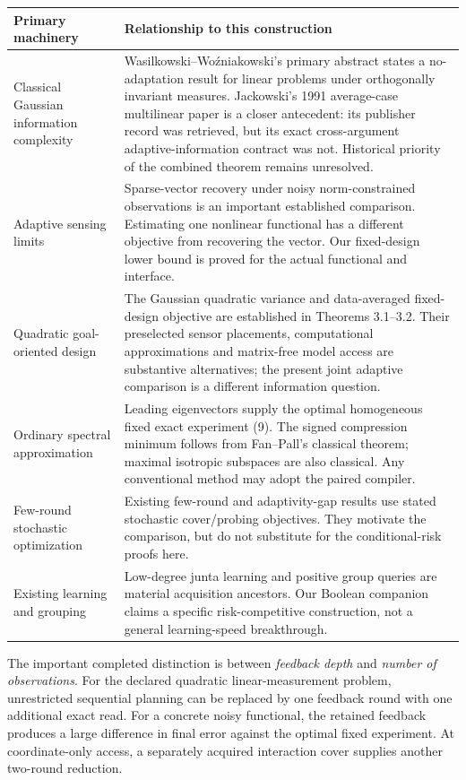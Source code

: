 \documentclass[11pt,a4paper]{article}
\begin{document}
\begin{longtable}{>{\raggedright\arraybackslash}p{}>{\raggedright\arraybackslash}p{}}
\toprule Primary machinery & Relationship to this construction\\\midrule\endhead
Classical Gaussian information complexity \cite{ww,ritter,jackowski} & Wasilkowski--Wo\'zniakowski's primary abstract states a no-adaptation result for linear problems under orthogonally invariant measures. Jackowski's 1991 average-case multilinear paper is a closer antecedent: its publisher record was retrieved, but its exact cross-argument adaptive-information contract was not. Historical priority of the combined theorem remains unresolved.\\[4pt]
Adaptive sensing limits \cite{acd} & Sparse-vector recovery under noisy norm-constrained observations is an important established comparison. Estimating one nonlinear functional has a different objective from recovering the vector. Our fixed-design lower bound is proved for the actual functional and interface.\\[4pt]
Quadratic goal-oriented design \cite{goal} & The Gaussian quadratic variance and data-averaged fixed-design objective are established in Theorems 3.1--3.2. Their preselected sensor placements, computational approximations and matrix-free model access are substantive alternatives; the present joint adaptive comparison is a different information question.\\[4pt]
Ordinary spectral approximation \cite{fanpall} & Leading eigenvectors supply the optimal homogeneous fixed exact experiment (9). The signed compression minimum follows from Fan--Pall's classical theorem; maximal isotropic subspaces are also classical. Any conventional method may adopt the paired compiler.\\[4pt]
Few-round stochastic optimization \cite{ghuge,gns} & Existing few-round and adaptivity-gap results use stated stochastic cover/probing objectives. They motivate the comparison, but do not substitute for the conditional-risk proofs here.\\[4pt]
Existing learning and grouping \cite{ei,astra1071} & Low-degree junta learning and positive group queries are material acquisition ancestors. Our Boolean companion claims a specific risk-competitive construction, not a general learning-speed breakthrough.\\\bottomrule
\end{longtable}

The important completed distinction is between \emph{feedback depth} and \emph{number of observations}. For the declared quadratic linear-measurement problem, unrestricted sequential planning can be replaced by one feedback round with one additional exact read. For a concrete noisy functional, the retained feedback produces a large difference in final error against the optimal fixed experiment. At coordinate-only access, a separately acquired interaction cover supplies another two-round reduction.
\end{document}
